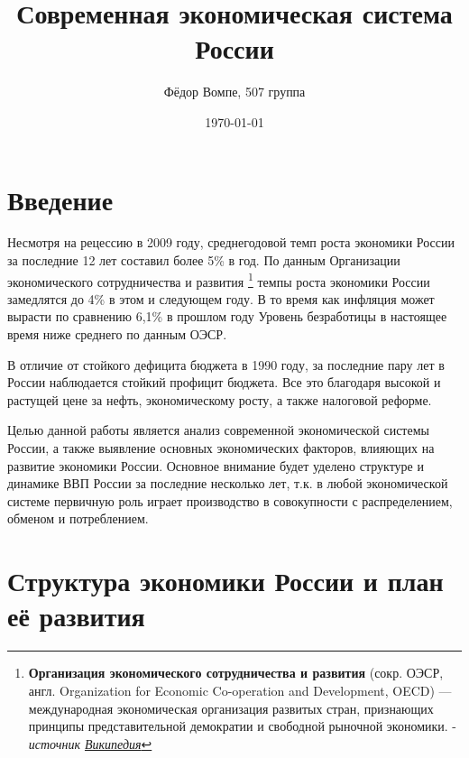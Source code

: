 \documentclass[a4paper,12pt]{article}
\title{Современная экономическая система России} %
\author{Фёдор Вомпе, 507 группа}
\date{\today} %
\begin{document}
\maketitle

\section{Введение}

Несмотря на рецессию в 2009 году, среднегодовой темп роста экономики России за
последние 12 лет составил более 5\% в год\cite{TheEconomist}. По данным
Организации экономического сотрудничества и развития 
\footnote{ \textbf{Организация экономического сотрудничества
и развития} (сокр. ОЭСР, англ. Organization for Economic Co-operation and
Development, OECD) — международная экономическая организация развитых стран,
признающих принципы представительной демократии и свободной рыночной экономики.
- \textit{источник
\href{http://ru.wikipedia.org/wiki/Организация экономического сотрудничества
и развития}{Википедия}} } темпы роста экономики России замедлятся 
до 4\% в этом и следующем году\cite{StandardPoor}. В то время как инфляция может
вырасти по сравнению 6,1\% в прошлом году
Уровень безработицы в настоящее время ниже среднего по данным ОЭСР.

В отличие от стойкого дефицита бюджета в 1990 году, за последние пару лет
в России наблюдается стойкий профицит бюджета. Все это благодаря
высокой и растущей цене за нефть, экономическому росту, а также
налоговой реформе.

Целью данной работы является анализ современной экономической
системы России, а также выявление основных экономических факторов, влияющих на
развитие экономики России. Основное внимание будет уделено структуре и динамике
ВВП России за последние несколько лет, т.к. в любой экономической системе
первичную роль играет производство в совокупности с распределением, обменом и потреблением.

\section{Структура экономики России и план её развития}
\end{document}
